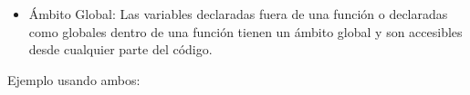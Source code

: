     \begin{figure}[h]
        \centering
      \end{figure}


\begin{itemize}
    \item Ámbito Global: Las variables declaradas fuera de una función o declaradas como globales dentro de una función tienen un ámbito global y son accesibles desde cualquier parte del código.
\end{itemize}

    \begin{figure}[h]
        \centering
      \end{figure}
\newpage

Ejemplo usando ambos:

\begin{figure}[h]
    \centering
  \end{figure}


